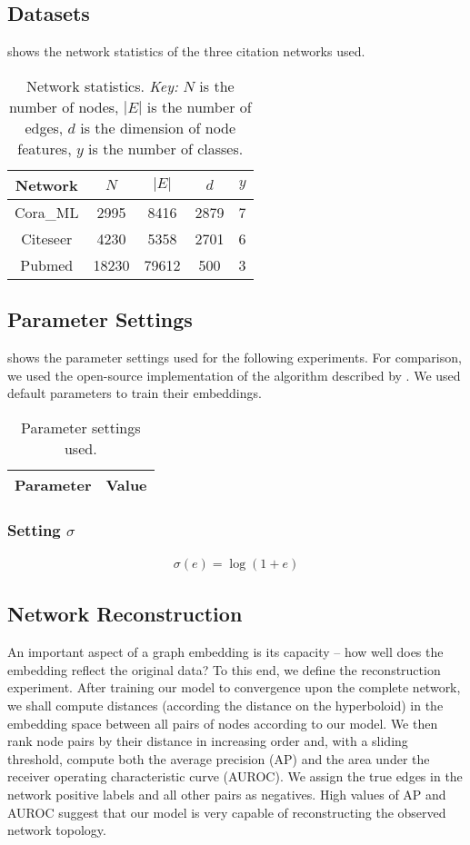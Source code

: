 \documentclass{article}
\begin{document}
\subsection{Datasets}

 shows the network statistics of the three citation networks used. 
\begin{table*}
	\centering
	\begin{tabular}{c | c | c | c | c}
		Network & $N$ & $|E|$ & $d$ & $y$ \\ \hline
		Cora\_ML & 2995 & 8416 & 2879 & 7 \\
		Citeseer & 4230 & 5358 & 2701 & 6 \\
		Pubmed & 18230 & 79612 & 500 & 3 \\
	\end{tabular}
	\caption{Network statistics. \textit{Key:} $N$ is the number of nodes, $|E|$ is the number of edges, $d$ is the dimension of node features, $y$ is the number of classes.}
	\label{table1}
\end{table*}

\subsection{Parameter Settings}
 shows the parameter settings used for the following experiments. 
For comparison, we used the open-source implementation of the algorithm described by \cite{nickel2017poincar}.
We used default parameters to train their embeddings.
\begin{table*}
	\centering
	\begin{tabular}{c | c }
		Parameter & Value \\ \hline
	\end{tabular}
	\caption{Parameter settings used.}
	\label{table2}
\end{table*}

\subsubsection{Setting $\sigma$}

\begin{align*}
\sigma(e) = \log(1 + e)
\end{align*}

\subsection{Network Reconstruction}
An important aspect of a graph embedding is its capacity -- how well does the embedding reflect the original data? 
To this end, we define the reconstruction experiment.
After training our model to convergence upon the complete network, we shall compute distances (according the distance on the hyperboloid) in the embedding space between all pairs of nodes according to our model. 
We then rank node pairs by their distance in increasing order and, with a sliding threshold, compute both the average precision (AP) and the area under the receiver operating characteristic curve (AUROC).
We assign the true edges in the network positive labels and all other pairs as negatives.
High values of AP and AUROC suggest that our model is very capable of reconstructing the observed network topology.
\end{document}
